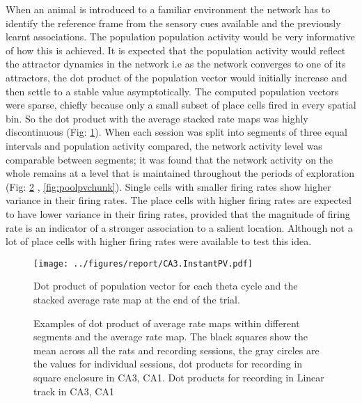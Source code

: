 When an animal is introduced to a familiar environment the network has to identify the reference frame from the sensory cues available and the previously learnt associations. The population population activity would be very informative of how this is achieved. It is expected that the population activity would reflect the attractor dynamics in the network i.e as the network converges to one of its attractors, the dot product of the population vector would initially increase and then settle to a stable value asymptotically. The computed population vectors were sparse, chiefly because only a small subset of place cells fired in every spatial bin. So the dot product with the average stacked rate maps was highly discontinuous (Fig: \ref{fig:tpv}).
When each session was split into segments of three equal intervals and population activity compared, the network activity level was comparable between segments; it was found that the network activity on the whole remains at a level that is maintained throughout the periods of exploration (Fig: \ref{fig:pvchunks} , \ref{fig:poolpvchunk}). Single cells with smaller firing rates show higher variance in their firing rates. The place cells with higher firing rates are expected to have lower variance in their firing rates, provided that the magnitude of firing rate is an indicator of a stronger association to a salient location. Although not a lot of place cells with higher firing rates were available to test this idea.\\
\begin{figure}[htb!]
\centering
\texttt{[image: ../figures/report/CA3.InstantPV.pdf]}
\caption[Population vector, fine time scale]{Dot product of population vector for each theta cycle and the stacked average rate map at the end of the trial.}
\label{fig:tpv}
\end{figure}

\begin{figure}[htb!]
\centering
{}
\caption[Average population vectors]{Examples of dot product of average rate maps within different segments and the average rate map. The black squares show the mean across all the rats and recording sessions, the gray circles are the values for individual sessions, dot products for recording in square enclosure in  CA3,  CA1. Dot products for recording in Linear track in  CA3,  CA1}
\label{fig:pvchunks}
\end{figure}

